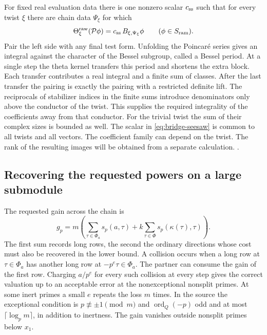 For fixed real evaluation data there is one nonzero scalar \(c_{\rm ss}\) such that for every twist \(\xi\) there are chain data \(\Psi_\xi\) for which
\begin{equation}\label{eq:bridge-seesaw}
   \Theta^{\rm raw}_\xi(\mathcal P\phi)=
          c_{\rm ss}\,B_{\xi,\Psi_\xi}\phi
       \qquad (\phi\in S_{\rm ram}).
\end{equation}
Pair the left side with any final test form. Unfolding the Poincar\'e series gives an integral against the character of the Bessel subgroup, called a Bessel period. At a single step the theta kernel transfers this period and shortens the extra block. Each transfer contributes a real integral and a finite sum of classes. After the last transfer the pairing is exactly the pairing with a restricted definite lift. The reciprocals of stabilizer indices in the finite sums introduce denominators only above the conductor of the twist. This supplies the required integrality of the coefficients away from that conductor. For the trivial twist the sum of their complex sizes is bounded as well. The scalar in \eqref{eq:bridge-seesaw} is common to all twists and all vectors. The coefficient family can depend on the twist. The rank of the resulting images will be obtained from a separate calculation. .

\subsection{Recovering the requested powers on a large submodule}

The requested gain across the chain is
\[
 g_p=m\left(\sum_{\tau\in\Phi_a}s_p(a,\tau)+
              k\sum_{\tau\in\Phi}s_p(\kappa(\tau),\tau)\right).
\]
The first sum records long rows, the second the ordinary directions whose cost must also be recovered in the lower bound. A collision occurs when a long row at \(\tau\in\Phi_a\) has another long row at \(-p^e\tau\in\Phi_a\). The partner can consume the gain of the first row. Charging \(a/p^e\) for every such collision at every step gives the correct valuation up to an acceptable error at the nonexceptional nonsplit primes. At some inert primes a small \(e\) repeats the loss \(m\) times. In the source the exceptional condition is \(p\not\equiv\pm1\pmod m\) and \(\operatorname{ord}_{Q}(-p)\) odd and at most \(\lceil\log_p m\rceil\), in addition to inertness. The gain vanishes outside nonsplit primes below \(x_1\).

